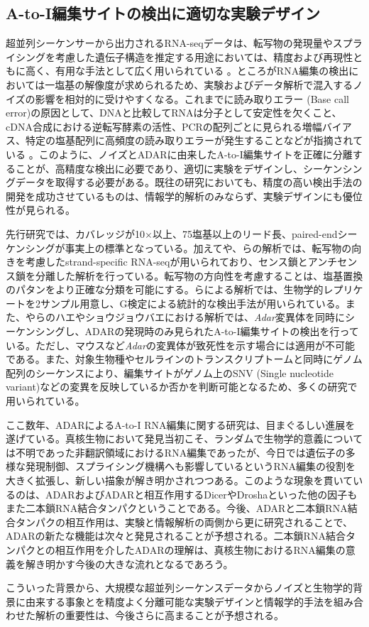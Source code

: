 \subsection{A-to-I編集サイトの検出に適切な実験デザイン}
超並列シーケンサーから出力されるRNA-seqデータは、転写物の発現量やスプライシングを考慮した遺伝子構造を推定する用途においては、精度および再現性ともに高く、有用な手法として広く用いられている \citep{MarMasMan0809, MorWilMcC0807}。ところがRNA編集の検出においては一塩基の解像度が求められるため、実験およびデータ解析で混入するノイズの影響を相対的に受けやすくなる。これまでに読み取りエラー (Base call error)の原因として、DNAと比較してRNAは分子として安定性を欠くこと、cDNA合成における逆転写酵素の活性、PCRの配列ごとに見られる増幅バイアス、特定の塩基配列に高頻度の読み取りエラーが発生することなどが指摘されている \citep{NakOshMor1107, AirRosChe11, pmid22099972}。このように、ノイズとADARに由来したA-to-I編集サイトを正確に分離することが、高精度な検出に必要であり、適切に実験をデザインし、シーケンシングデータを取得する必要がある。既往の研究においても、精度の高い検出手法の開発を成功させているものは、情報学的解析のみならず、実験デザインにも優位性が見られる。
\par
先行研究では、カバレッジが10$\times$以上、75塩基以上のリード長、paired-endシーケンシングが事実上の標準となっている。加えて\cite{Ramaswami:2012aa}や\cite{Peng:2012aa}、\cite{Zhu:2013aa}らの解析では、転写物の向きを考慮したstrand-specific RNA-seqが用いられており、センス鎖とアンチセンス鎖を分離した解析を行っている。転写物の方向性を考慮することは、塩基置換のパタンをより正確な分類を可能にする。\cite{Rodriguez:2012aa}らによる解析では、生物学的レプリケートを2サンプル用意し、G検定による統計的な検出手法が用いられている。また、\cite{BahLeeLi1201}や\cite{Rodriguez:2012aa}らのハエやショウジョウバエにおける解析では、\textit{Adar}変異体を同時にシーケンシングし、ADARの発現時のみ見られたA-to-I編集サイトの検出を行っている。ただし、マウスなど\textit{Adar}の変異体が致死性を示す場合には適用が不可能である。また、対象生物種やセルラインのトランスクリプトームと同時にゲノム配列のシーケンスにより、編集サイトがゲノム上のSNV (Single nucleotide variant)などの変異を反映しているか否かを判断可能となるため、多くの研究で用いられている。
\par
ここ数年、ADARによるA-to-I RNA編集に関する研究は、目まぐるしい進展を遂げている。真核生物において発見当初こそ、ランダムで生物学的意義については不明であった非翻訳領域におけるRNA編集であったが、今日では遺伝子の多様な発現制御、スプライシング機構へも影響しているというRNA編集の役割を大きく拡張し、新しい描象が解き明かされつつある。このような現象を貫いているのは、ADARおよびADARと相互作用するDicerやDroshaといった他の因子もまた二本鎖RNA結合タンパクということである。今後、ADARと二本鎖RNA結合タンパクの相互作用は、実験と情報解析の両側から更に研究されることで、ADARの新たな機能は次々と発見されることが予想される。二本鎖RNA結合タンパクとの相互作用を介したADARの理解は、真核生物におけるRNA編集の意義を解き明かす今後の大きな流れとなるであろう。
\par
こういった背景から、大規模な超並列シーケンスデータからノイズと生物学的背景に由来する事象とを精度よく分離可能な実験デザインと情報学的手法を組み合わせた解析の重要性は、今後さらに高まることが予想される。
